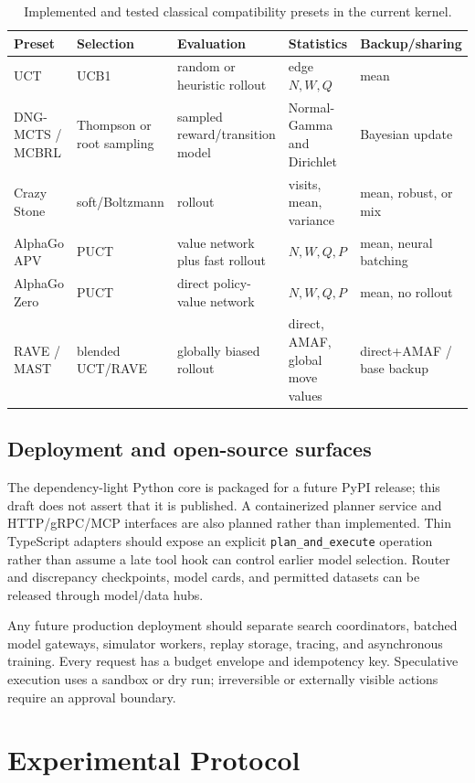 \documentclass[10pt,twocolumn]{article}
\begin{document}
\begin{table}[t]
\centering
\small
\caption{Implemented and tested classical compatibility presets in the current kernel.}
\label{tab:presets}
\begin{tabularx}{\textwidth}{@{}lXXXX@{}}
\toprule
Preset & Selection & Evaluation & Statistics & Backup/sharing \\
\midrule
UCT & UCB1 & random or heuristic rollout & edge \(N,W,Q\) & mean \\
DNG-MCTS / MCBRL & Thompson or root sampling & sampled reward/transition model & Normal-Gamma and Dirichlet & Bayesian update \\
Crazy Stone & soft/Boltzmann & rollout & visits, mean, variance & mean, robust, or mix \\
AlphaGo APV & PUCT & value network plus fast rollout & \(N,W,Q,P\) & mean, neural batching \\
AlphaGo Zero & PUCT & direct policy-value network & \(N,W,Q,P\) & mean, no rollout \\
RAVE / MAST & blended UCT/RAVE & globally biased rollout & direct, AMAF, global move values & direct+AMAF / base backup \\
\bottomrule
\end{tabularx}
\end{table}

\subsection{Deployment and open-source surfaces}

The dependency-light Python core is packaged for a future PyPI release; this
draft does not assert that it is published. A containerized planner service and
HTTP/gRPC/MCP interfaces are also planned rather than implemented. Thin
TypeScript adapters should expose an explicit
\texttt{plan\_and\_execute} operation rather than assume a late tool hook can
control earlier model selection. Router and discrepancy checkpoints, model
cards, and permitted datasets can be released through model/data hubs.

Any future production deployment should separate search coordinators, batched model gateways,
simulator workers, replay storage, tracing, and asynchronous training. Every
request has a budget envelope and idempotency key. Speculative execution uses a
sandbox or dry run; irreversible or externally visible actions require an
approval boundary.

\section{Experimental Protocol}
\end{document}

